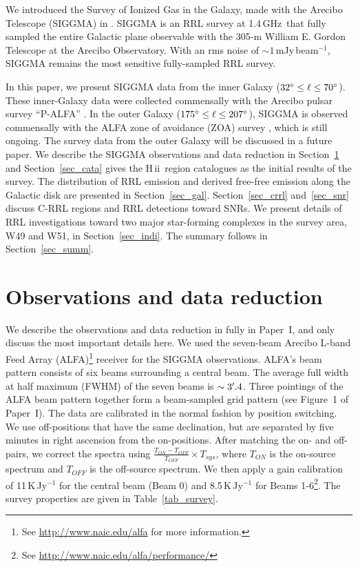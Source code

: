 \documentclass[manuscript]{aastex61}
\newcommand{\hii}{{\rm H\,}{{\sc ii}}}
\newcommand{\ghz}{\,GHz}
\begin{document}
We introduced the Survey of Ionized Gas in the Galaxy, made with the Arecibo Telescope (SIGGMA) in \citet[hereafter ``Paper I'']{Liu2013}.
SIGGMA is an RRL survey at 1.4\ghz\ that fully sampled the entire Galactic plane observable with the 305-m William E. Gordon Telescope at the Arecibo Observatory.
With an rms noise of $\sim1$\,mJy\,beam$^{-1}$, SIGGMA remains the most sensitive fully-sampled RRL survey.

In this paper, we present SIGGMA data from the inner Galaxy ($32 \mbox{$^\circ$} \leq \ell \leq 70 \mbox{$^\circ$}$).
These inner-Galaxy data were collected commensally with the Arecibo pulsar survey ``P-ALFA'' \citep{Cordes2006, Lazarus2015}.
In the outer Galaxy ($175 \mbox{$^\circ$} \leq \ell \leq 207 \mbox{$^\circ$} $), SIGGMA is observed commensally with the ALFA zone of avoidance (ZOA) survey \citep[][]{McIntyre2015}, which is still ongoing.
The survey data from the outer Galaxy will be discussed in a future paper. 
We describe the SIGGMA observations and data reduction in Section~\ref{sec_obs_data} and Section~\ref{sec_cata} gives the \hii\ region catalogues as the initial results of the survey. 
The distribution of RRL emission and derived free-free emission along the Galactic disk are presented in Section~\ref{sec_gal}.
Section~\ref{sec_crrl} and~\ref{sec_snr} discuss C-RRL regions and RRL detections toward SNRs.
We present details of RRL investigations toward two major star-forming complexes in the survey area, W49 and W51, in Section~\ref{sec_indi}.
The summary follows in Section~\ref{sec_summ}.

\section{Observations and data reduction} \label{sec_obs_data}

We describe the observations and data reduction in fully in Paper~I, and only discuss the most important details here.
We used the seven-beam Arecibo L-band Feed Array (ALFA)\footnote{See \url{http://www.naic.edu/alfa} for more information.} receiver for the SIGGMA observations.
ALFA's beam pattern consists of six beams surrounding a central beam.
The average full width at half maximum (FWHM) of the seven beams is $\sim3\mbox{$^\prime$}.4$.
Three pointings of the ALFA beam pattern together form a beam-sampled grid pattern (see Figure~1 of Paper~I).
The data are calibrated in the normal fashion by position switching. 
We use off-positions that have the same declination, but are separated by five minutes in right ascension from the on-positions.
After matching the on- and off-pairs, we correct the spectra using  $\frac{T_{ON}-T_{OFF}}{T_{OFF}}\times T_{sys}$, where $T_{ON}$ is the on-source spectrum and $T_{OFF}$ is the off-source spectrum.
We then apply a gain calibration of 11\,K\,Jy$^{-1}$ for the central beam (Beam 0) and 8.5\,K\,Jy$^{-1}$ for Beams 1-6\footnote{See \url{http://www.naic.edu/alfa/performance/}}.
The survey properties are given in Table~\ref{tab_survey}.
\end{document}
